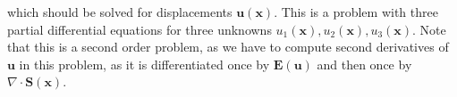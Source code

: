  which should be solved for displacements $\mathbf{u}(\mathbf{x})$. This is a problem with three partial differential equations for three unknowns $u_1(\mathbf{x}), u_2(\mathbf{x}), u_3(\mathbf{x})$.
Note that this is a second order problem, as we have to compute second derivatives of $\mathbf{u}$ in this problem, as it is differentiated once by $\mathbf{E}(\mathbf{u})$ and then once by $\nabla \cdot \mathbf{S}(\mathbf{x})$.

    


    


